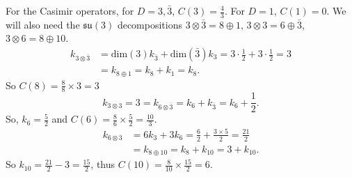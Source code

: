 \documentclass[main.tex]{subfiles}
\begin{document}
For the Casimir operators, for $D=3,\bar{3}$, $C(3)=\frac{4}{3}$. For $D=1$, $C(1)=0$. We will also need the $\mathfrak{su}(3)$ decompositions $3\otimes\bar{3}=8\oplus1$, $3\otimes3=6\oplus\bar{3}$, $3\otimes6=8\oplus10$.
\begin{align}
k_{3\otimes\bar{3}}&=\text{dim}(3)k_{\bar{3}}+\text{dim}(\bar{3})k_3=3\cdot\frac{1}{2}+3\cdot\frac{1}{2}=3\\
&=k_{8\oplus1}=k_8+k_1=k_8.
\end{align}
So $C(8)=\frac{8}{8}\times3=3$
\begin{equation}
k_{3\otimes3}=3=k_{6\otimes\bar{3}}=k_6+k_{\bar{3}}=k_6+\frac{1}{2}.
\end{equation}
So, $k_6=\frac{5}{2}$ and $C(6)=\frac{8}{6}\times\frac{5}{2}=\frac{10}{3}$.
\begin{align}
k_{6\otimes3}&=6k_3+3k_6=\frac{6}{2}+\frac{3\times5}{2}=\frac{21}{2}\\
&=k_{8\oplus10}=k_8+k_{10}=3+k_{10}.
\end{align}
So $k_{10}=\frac{21}{2}-3=\frac{15}{2}$, thus $C(10)=\frac{8}{10}\times\frac{15}{2}=6$.
\end{document}
